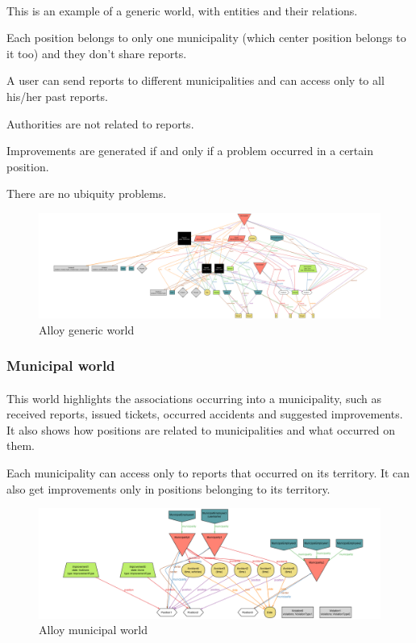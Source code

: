				\paragraph{}
					This is an example of a generic world, with entities and their relations.
					
					Each position belongs to only one municipality (which center position belongs to it too) and they don't share reports. 
					
					A user can send reports to different municipalities and can access only to all his/her past reports.
					
					Authorities are not related to reports.
					
					Improvements are generated if and only if a problem occurred in a certain position.
					
					There are no ubiquity problems.
					\begin{figure}[!h]
						\includegraphics[width=\textwidth]{images/Alloy/GenericWorld.png}
						\caption{Alloy generic world}
					\end{figure}
			\subsubsection{Municipal world}
				\paragraph{}
					This world highlights the associations occurring into a municipality, such as received reports, issued tickets, occurred accidents and suggested improvements. It also shows how positions are related to municipalities and what occurred on them.
					
					Each municipality can access only to reports that occurred on its territory. It can also get improvements only in positions belonging to its territory.
					\begin{figure}[!h]
						\includegraphics[width=\textwidth]{images/Alloy/MunicipalWorld.png}
						\caption{Alloy municipal world}
					\end{figure}
			\clearpage
